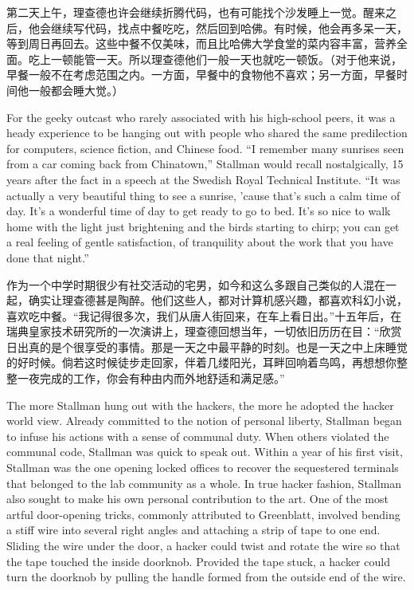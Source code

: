 \ifdefined\chs
第二天上午，理查德也许会继续折腾代码，也有可能找个沙发睡上一觉。醒来之后，他会继续写代码，找点中餐吃吃，然后回到哈佛。有时候，他会再多呆一天，等到周日再回去。这些中餐不仅美味，而且比哈佛大学食堂的菜内容丰富，营养全面。吃上一顿能管一天。所以理查德他们一般一天也就吃一顿饭。（对于他来说，早餐一般不在考虑范围之内。一方面，早餐中的食物他不喜欢；另一方面，早餐时间他一般都会睡大觉。）
\fi

\ifdefined\eng
For the geeky outcast who rarely associated with his high-school peers, it was a heady experience to be hanging out with people who shared the same predilection for computers, science fiction, and Chinese food. ``I remember many sunrises seen from a car coming back from Chinatown,'' Stallman would recall nostalgically, 15 years after the fact in a speech at the Swedish Royal Technical Institute. ``It was actually a very beautiful thing to see a sunrise, 'cause that's such a calm time of day. It's a wonderful time of day to get ready to go to bed. It's so nice to walk home with the light just brightening and the birds starting to chirp; you can get a real feeling of gentle satisfaction, of tranquility about the work that you have done that night.''
\fi

\ifdefined\chs
作为一个中学时期很少有社交活动的宅男，如今和这么多跟自己类似的人混在一起，确实让理查德甚是陶醉。他们这些人，都对计算机感兴趣，都喜欢科幻小说，喜欢吃中餐。``我记得很多次，我们从唐人街回来，在车上看日出。''十五年后，在瑞典皇家技术研究所的一次演讲上，理查德回想当年，一切依旧历历在目：``欣赏日出真的是个很享受的事情。那是一天之中最平静的时刻。也是一天之中上床睡觉的好时候。倘若这时候徒步走回家，伴着几缕阳光，耳畔回响着鸟鸣，再想想你整整一夜完成的工作，你会有种由内而外地舒适和满足感。''
\fi

\ifdefined\eng
The more Stallman hung out with the hackers, the more he adopted the hacker world view. Already committed to the notion of personal liberty, Stallman began to infuse his actions with a sense of communal duty. When others violated the communal code, Stallman was quick to speak out. Within a year of his first visit, Stallman was the one opening locked offices to recover the sequestered terminals that belonged to the lab community as a whole. In true hacker fashion, Stallman also sought to make his own personal contribution to the art. One of the most artful door-opening tricks, commonly attributed to Greenblatt, involved bending a stiff wire into several right angles and attaching a strip of tape to one end. Sliding the wire under the door, a hacker could twist and rotate the wire so that the tape touched the inside doorknob. Provided the tape stuck, a hacker could turn the doorknob by pulling the handle formed from the outside end of the wire.
\fi

